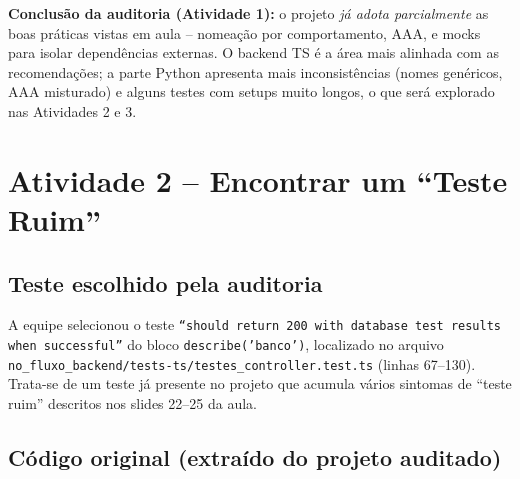 \documentclass[12pt,a4paper]{article}
\begin{document}
\textbf{Conclusão da auditoria (Atividade 1):} o projeto \emph{já
adota parcialmente} as boas práticas vistas em aula -- nomeação por
comportamento, AAA, e mocks para isolar dependências externas. O
backend TS é a área mais alinhada com as recomendações; a parte
Python apresenta mais inconsistências (nomes genéricos, AAA
misturado) e alguns testes com setups muito longos, o que será
explorado nas Atividades 2 e 3.

\section{Atividade 2 -- Encontrar um ``Teste Ruim''}

\subsection{Teste escolhido pela auditoria}

A equipe selecionou o teste
\texttt{``should return 200 with database test results when successful''}
do bloco \texttt{describe('banco')}, localizado no arquivo
\texttt{no\_fluxo\_backend/tests-ts/testes\_controller.test.ts}
(linhas 67--130). Trata-se de um teste já presente no projeto que
acumula vários sintomas de ``teste ruim'' descritos nos slides 22--25
da aula.

\subsection{Código original (extraído do projeto auditado)}
\end{document}

